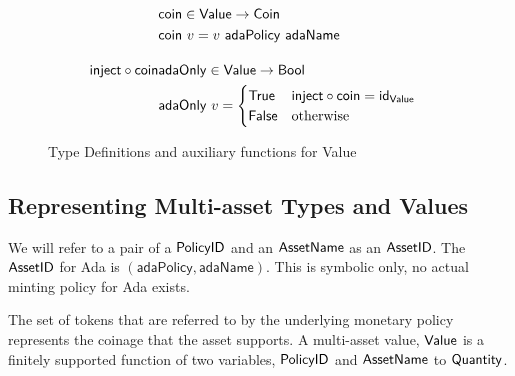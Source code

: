 \begin{figure*}[t!]
\begin{align*}
    \nextdef
    & \fun{coin} \in \Value \to \Coin \\
    & \fun{coin}~v = v~\mathsf{adaPolicy}~\mathsf{adaName}
    \nextdef \fun{inject} \circ \fun{coin}
    & \fun{adaOnly} \in \Value \to \Bool \\
    & \fun{adaOnly}~v =
      \begin{cases}
        \True & \fun{inject} \circ \fun{coin} = \fun{id}_{\Value} \\
        \False & \text{otherwise}
      \end{cases}
  \end{align*}
  \caption{Type Definitions and auxiliary functions for Value}
  \label{fig:defs:value}
\end{figure*}

\subsection*{Representing Multi-asset Types and Values}
We will refer to a pair of a $\mathsf{PolicyID}$ and an
$\mathsf{AssetName}$ as an $\mathsf{AssetID}$. The $\mathsf{AssetID}$ for Ada is $(\mathsf{adaPolicy}, \mathsf{adaName})$.
This is symbolic only, no actual minting policy for Ada exists.

The set of tokens that are referred to by the underlying monetary
policy represents the coinage that the asset supports. A multi-asset
value, $\mathsf{Value}$ is a finitely supported function of two variables,
$\mathsf{PolicyID}$ and $\mathsf{AssetName}$ to $\mathsf{Quantity}$.


